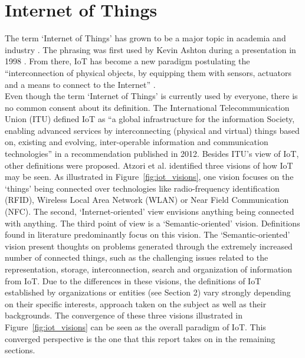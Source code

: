 \section{Internet of Things}
\label{sec:iot}
\vspace{-1em}
	The term `Internet of Things' has grown to be a major topic in academia and industry \cite{ju}. The phrasing was first used by Kevin Ashton during a presentation in 1998 \cite{westerlund}. From there, IoT has become a new paradigm postulating the ``interconnection of physical objects, by equipping them with sensors, actuators and a means to connect to the Internet'' \cite{dijkman}.\\
	Even though the term `Internet of Things' is currently used by everyone, there is no common consent about its definition. The International Telecommunication Union (ITU) defined IoT as ``a global infrastructure for the information Society, enabling advanced services by interconnecting (physical and virtual) things based on, existing and evolving, inter-operable information and communication technologies'' \cite{itu} in a recommendation published in 2012. Besides ITU's view of IoT, other definitions were proposed. Atzori et al. \cite{atzori} identified three visions of how IoT may be seen. As illustrated in Figure~\ref{fig:iot_visions}, one vision focuses on the `things' being connected over technologies like radio-frequency identification (RFID), Wireless Local Area Network (WLAN) or Near Field Communication (NFC). The second, `Internet-oriented' view envisions anything being connected with anything. The third point of view is a `Semantic-oriented' vision. Definitions found in literature predominantly focus on this vision. The `Semantic-oriented' vision present thoughts on problems generated through the extremely increased number of connected things, such as the challenging issues related to the representation, storage, interconnection, search and organization of information from IoT. Due to the differences in these visions, the definitions of IoT established by organizations or entities (see \cite{atzori} Section 2) vary strongly depending on their specific interests, approach taken on the subject as well as their backgrounds. The convergence of these three visions illustrated in Figure~\ref{fig:iot_visions} can be seen as the overall paradigm of IoT. This converged perspective is the one that this report takes on in the remaining sections. 

